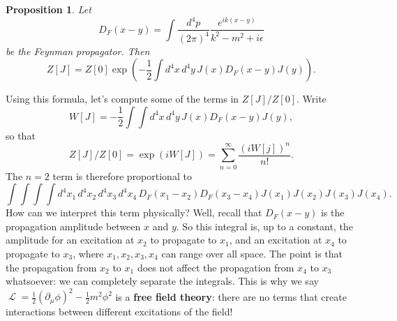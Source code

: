 \documentclass{report}
\theoremstyle{plain}
\newtheorem{proposition}[theorem]{Proposition}
\theoremstyle{definition}
\theoremstyle{remark}
\DeclareMathOperator{\cL}{\mathcal{L}}
\begin{document}
\begin{proposition}
  Let
  $$ D_F(x - y) = \int \frac{d^4p}{(2\pi)^4} \frac{e^{ik(x-y)}}{k^2 - m^2 + i\epsilon} $$
  be the Feynman propagator. Then
  $$ Z[J] = Z[0] \exp\left(-\frac{1}{2} \int d^4x \, d^4y \, J(x) D_F(x - y) J(y)\right). $$
\end{proposition}

Using this formula, let's compute some of the terms in $Z[J]/Z[0]$.
Write
$$ W[J] = -\frac{1}{2} \int \int d^4x \, d^4y \, J(x) D_F(x - y) J(y), $$
so that 
$$ Z[J]/Z[0] = \exp(i W[J]) = \sum_{n=0}^\infty \frac{(iW[j])^n}{n!}. $$
The $n = 2$ term is therefore proportional to
$$ \int\int\int\int d^4x_1 \, d^4x_2 \, d^4x_3 \, d^4x_4 \, D_F(x_1 - x_2) D_F(x_3 - x_4) J(x_1) J(x_2) J(x_3) J(x_4). $$
How can we interpret this term physically? Well, recall that
$D_F(x - y)$ is the propagation amplitude between $x$ and $y$. So this
integral is, up to a constant, the amplitude for an excitation at
$x_2$ to propagate to $x_1$, and an excitation at $x_4$ to propagate
to $x_3$, where $x_1, x_2, x_3, x_4$ can range over all space. The
point is that the propagation from $x_2$ to $x_1$ does not affect the
propagation from $x_4$ to $x_3$ whatsoever: we can completely separate
the integrals. This is why we say
$\cL = \frac{1}{2}(\partial_\mu\phi)^2 - \frac{1}{2}m^2\phi^2$ is a
{\bf free field theory}: there are no terms that create interactions
between different excitations of the field!
\end{document}
